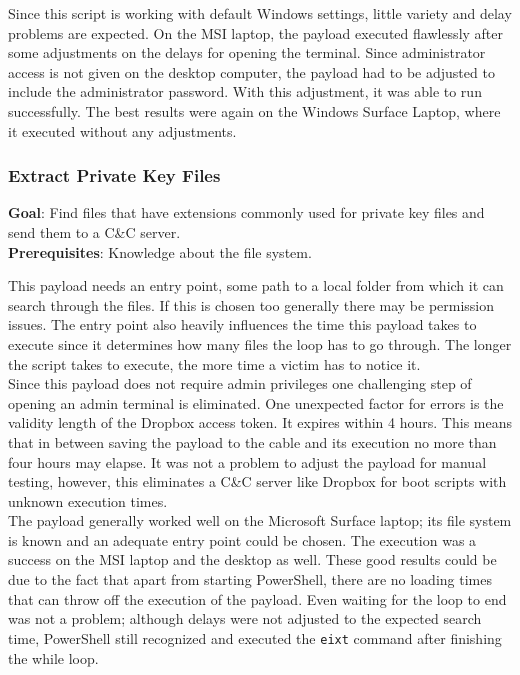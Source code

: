 Since this script is working with default Windows settings, little variety and delay problems are expected. On the MSI laptop, the payload executed flawlessly after some adjustments on the delays for opening the terminal. Since administrator access is not given on the desktop computer, the payload had to be adjusted to include the administrator password. With this adjustment, it was able to run successfully. The best results were again on the Windows Surface Laptop, where it executed without any adjustments. 


\subsubsection{Extract Private Key Files}

\textbf{Goal}: Find files that have extensions commonly used for private key files and send them to a C\&C server. \\
\textbf{Prerequisites}: Knowledge about the file system.

This payload needs an entry point, some path to a local folder from which it can search through the files. If this is chosen too generally there may be permission issues. The entry point also heavily influences the time this payload takes to execute since it determines how many files the loop has to go through. The longer the script takes to execute, the more time a victim has to notice it. \\
Since this payload does not require admin privileges one challenging step of opening an admin terminal is eliminated. One unexpected factor for errors is the validity length of the Dropbox access token. It expires within 4 hours. This means that in between saving the payload to the cable and its execution no more than four hours may elapse. It was not a problem to adjust the payload for manual testing, however, this eliminates a C\&C server like Dropbox for boot scripts with unknown execution times. \\

The payload generally worked well on the Microsoft Surface laptop; its file system is known and an adequate entry point could be chosen. The execution was a success on the MSI laptop and the desktop as well. These good results could be due to the fact that apart from starting PowerShell, there are no loading times that can throw off the execution of the payload. Even waiting for the loop to end was not a problem; although delays were not adjusted to the expected search time, PowerShell still recognized and executed the \verb|eixt| command after finishing the while loop.



